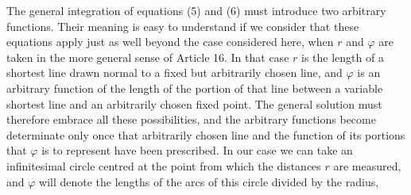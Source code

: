 The general integration of equations (5) and (6) must introduce two arbitrary functions. Their meaning is easy to understand if we consider that these equations apply just as well beyond the case considered here, when \(r\) and \(\varphi\) are taken in the more general sense of Article 16. In that case \(r\) is the length of a shortest line drawn normal to a fixed but arbitrarily chosen line, and \(\varphi\) is an arbitrary function of the length of the portion of that line between a variable shortest line and an arbitrarily chosen fixed point. The general solution must therefore embrace all these possibilities, and the arbitrary functions become determinate only once that arbitrarily chosen line and the function of its portions that \(\varphi\) is to represent have been prescribed. In our case we can take an infinitesimal circle centred at the point from which the distances \(r\) are measured, and \(\varphi\) will denote the lengths of the arcs of this circle divided by the radius,
